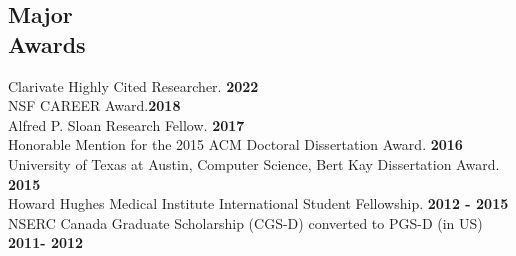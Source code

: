 \documentclass[margin,line,letterpaper]{resume-small}
\begin{document}
\begin{resume}
\begin{small}
      \vspace{-2mm}
    \section{\mysidestyle Major \\Awards}
    Clarivate Highly Cited Researcher. \hfill \textbf{2022}\\
    NSF CAREER Award.\hfill \textbf{2018}\\
    Alfred P. Sloan Research Fellow.\hfill \textbf{ 2017}\\
    Honorable Mention for the 2015 ACM Doctoral Dissertation Award.\hfill \textbf{ 2016}\\
     University of Texas at Austin, Computer Science, Bert Kay Dissertation Award. \hfill \textbf{2015}\\
     Howard Hughes Medical Institute International Student Fellowship. \hfill \textbf{2012 - 2015}
     \\ NSERC Canada Graduate Scholarship (CGS-D) converted to PGS-D (in US) \hfill \textbf{2011- 2012} 
     
%    
%    
    

\end{small}
\end{resume}
\end{document}
